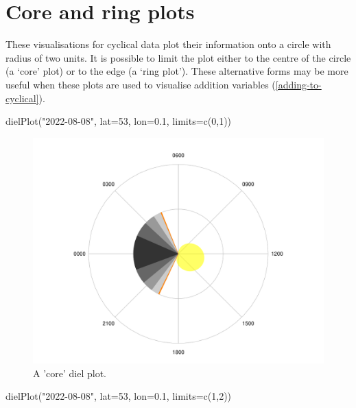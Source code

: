 \documentclass[
]{book}
\newenvironment{Shaded}{\begin{snugshade}}{\end{snugshade}}
\newcommand{\AttributeTok}[1]{\textcolor[rgb]{0.77,0.63,0.00}{#1}}
\newcommand{\DecValTok}[1]{\textcolor[rgb]{0.00,0.00,0.81}{#1}}
\newcommand{\FloatTok}[1]{\textcolor[rgb]{0.00,0.00,0.81}{#1}}
\newcommand{\FunctionTok}[1]{\textcolor[rgb]{0.00,0.00,0.00}{#1}}
\newcommand{\NormalTok}[1]{#1}
\newcommand{\StringTok}[1]{\textcolor[rgb]{0.31,0.60,0.02}{#1}}
\begin{document}
\hypertarget{core-and-ring-plots}{%
\section{Core and ring plots}\label{core-and-ring-plots}}

These visualisations for cyclical data plot their information onto a circle with radius of two units. It is possible to limit the plot either to the centre of the circle (a `core' plot) or to the edge (a `ring plot'). These alternative forms may be more useful when these plots are used to visualise addition variables (\ref{adding-to-cyclical}).

\begin{Shaded}
\begin{Highlighting}[]
\FunctionTok{dielPlot}\NormalTok{(}\StringTok{"2022{-}08{-}08"}\NormalTok{, }\AttributeTok{lat=}\DecValTok{53}\NormalTok{, }\AttributeTok{lon=}\FloatTok{0.1}\NormalTok{, }\AttributeTok{limits=}\FunctionTok{c}\NormalTok{(}\DecValTok{0}\NormalTok{,}\DecValTok{1}\NormalTok{))}
\end{Highlighting}
\end{Shaded}

\begin{figure}

{\centering \includegraphics[width=0.9\linewidth]{_main_files/figure-latex/diel-plot-core-1} 

}

\caption{A 'core' diel plot.}\label{fig:diel-plot-core}
\end{figure}

\begin{Shaded}
\begin{Highlighting}[]
\FunctionTok{dielPlot}\NormalTok{(}\StringTok{"2022{-}08{-}08"}\NormalTok{, }\AttributeTok{lat=}\DecValTok{53}\NormalTok{, }\AttributeTok{lon=}\FloatTok{0.1}\NormalTok{, }\AttributeTok{limits=}\FunctionTok{c}\NormalTok{(}\DecValTok{1}\NormalTok{,}\DecValTok{2}\NormalTok{))}
\end{Highlighting}
\end{Shaded}
\end{document}
